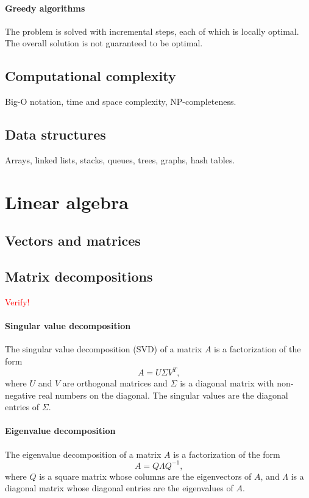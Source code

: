 \paragraph{Greedy algorithms}  The problem is solved with incremental steps, each of which
is locally optimal.  The overall solution is not guaranteed to be optimal.

\subsection{Computational complexity}

Big-O notation, time and space complexity, NP-completeness.

\subsection{Data structures}

Arrays, linked lists, stacks, queues, trees, graphs, hash tables.

\section{Linear algebra}

\subsection{Vectors and matrices}

\subsection{Matrix decompositions}

\textcolor{red}{Verify!}

\paragraph{Singular value decomposition} The singular value decomposition (SVD) of a
matrix $A$ is a factorization of the form
\begin{equation}
  \label{eq:svd}
  A = U \Sigma V^T\text{,}
\end{equation}
where $U$ and $V$ are orthogonal matrices and $\Sigma$ is a diagonal
matrix with non-negative real numbers on the diagonal.  The singular values are the
diagonal entries of $\Sigma$.

\paragraph{Eigenvalue decomposition}  The eigenvalue decomposition of a matrix $A$
is a factorization of the form
\begin{equation}
  \label{eq:eigdec}
  A = Q \Lambda Q^{-1}\text{,}
\end{equation}
where $Q$ is a square matrix whose columns are the eigenvectors of $A$, and
$\Lambda$ is a diagonal matrix whose diagonal entries are the eigenvalues of
$A$.

